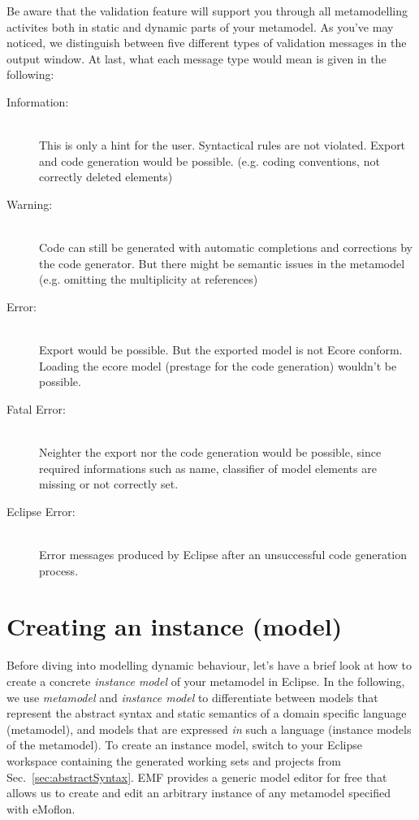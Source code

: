 Be aware that the validation feature will support you through all metamodelling
activites both in static and dynamic parts of your metamodel. As you've may
noticed, we distinguish between five different types of validation messages in
the output window. At last, what each message type would mean is given in the
following:

\begin{description}
  \item[Information:]~\\ This is only a hint for the user. Syntactical rules
  are not violated. Export and code generation would be possible. (e.g. coding
  conventions, not correctly deleted elements)
  \item[Warning:]~\\ Code can still be generated with automatic completions and
  corrections by the code generator. But there might be semantic issues in the
  metamodel (e.g. omitting the multiplicity at references)
  \item[Error:]~\\ Export would be possible. But the exported model is not
  Ecore conform. Loading the ecore model (prestage for the code generation)
  wouldn't be possible.
  \item[Fatal Error:]~\\ Neighter the export nor the code generation would be
  possible, since required informations such as name, classifier of model
  elements are missing or not correctly set.
  \item[Eclipse Error:]~\\ Error messages produced by Eclipse after an
  unsuccessful code generation process.

\end{description}

\section{Creating an instance (model)}
\label{sect:instance}

Before diving into modelling dynamic behaviour, let's have a brief look at how
to create a concrete \emph{instance model} of your metamodel in Eclipse.
In the following, we use \emph{metamodel} and \emph{instance model} to
differentiate between models that represent the abstract syntax and
static semantics of a domain specific language (metamodel), and models that are
expressed \emph{in} such a language (instance models of the metamodel).
 To create an instance model, switch to your Eclipse workspace containing
the generated working sets and projects from Sec.~\ref{sec:abstractSyntax}.
EMF provides a generic model editor for free that allows us to create and edit
an arbitrary instance of any metamodel specified with eMoflon. 

